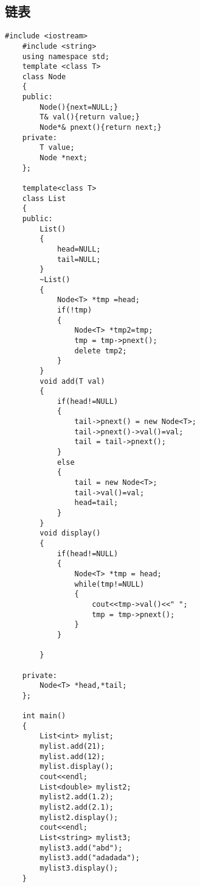 \documentclass[UTF8]{ctexart}
\begin{document}
\subsection{链表}
\begin{lstlisting}[language={[ANSI]C++}]
    #include <iostream>
    #include <string>
    using namespace std;
    template <class T> 
    class Node
    {
    public:
        Node(){next=NULL;}
        T& val(){return value;}
        Node*& pnext(){return next;}
    private:
        T value;
        Node *next;
    };
    
    template<class T>
    class List
    {
    public:
        List()
        {
            head=NULL;
            tail=NULL;
        }
        ~List()
        {
            Node<T> *tmp =head;
            if(!tmp)
            {
                Node<T> *tmp2=tmp;
                tmp = tmp->pnext();
                delete tmp2;
            }
        }
        void add(T val)
        {
            if(head!=NULL)
            {
                tail->pnext() = new Node<T>;
                tail->pnext()->val()=val;
                tail = tail->pnext();
            }
            else
            {
                tail = new Node<T>;
                tail->val()=val;
                head=tail;   
            }
        }
        void display()
        {
            if(head!=NULL)
            {
                Node<T> *tmp = head;
                while(tmp!=NULL)
                {
                    cout<<tmp->val()<<" ";
                    tmp = tmp->pnext();
                }
            }
            
        }
    
    private:
        Node<T> *head,*tail;
    };
    
    int main()
    {
        List<int> mylist;
        mylist.add(21);
        mylist.add(12);
        mylist.display();
        cout<<endl;
        List<double> mylist2;
        mylist2.add(1.2);
        mylist2.add(2.1);
        mylist2.display();
        cout<<endl;
        List<string> mylist3;
        mylist3.add("abd");
        mylist3.add("adadada");
        mylist3.display();
    }
\end{lstlisting}
\end{document}
